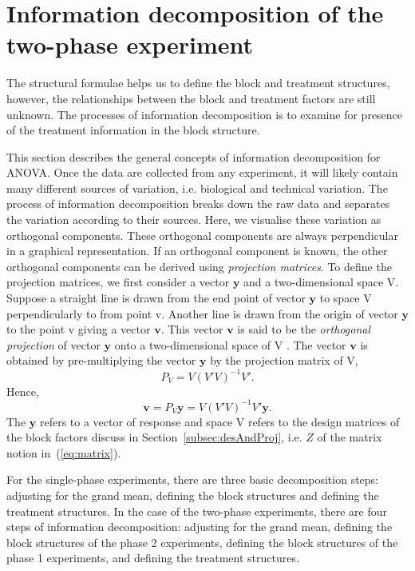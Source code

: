 \documentclass[article]{jss}
\begin{document}
\section[Information Decomposition]{Information decomposition of the two-phase experiment} \label{sec:infoDecomp}
The structural formulae helps us to define the block and treatment structures, however, the relationships between the block and treatment factors are still unknown. The processes of information decomposition is to examine for presence of the treatment information in the block structure.

This section describes the general concepts of information decomposition for ANOVA. Once the data are collected from any experiment, it will likely contain many different sources of variation, i.e. biological and technical variation. The process of information decomposition breaks down the raw data and separates the variation according to their sources. Here, we visualise these variation as orthogonal components. These orthogonal components are always perpendicular in a graphical representation. If an orthogonal component is known, the other orthogonal components can be derived using \emph{projection matrices}. To define the projection matrices, we first consider a vector $\bm{y}$ and a two-dimensional space V. Suppose a straight line is drawn from the end point of vector $\bm{y}$ to space V perpendicularly to from point v. Another line is drawn from the origin of vector $\bm{y}$ to the point v giving a vector $\bm{v}$. This vector $\bm{v}$ is said to be the \emph{orthogonal projection} of vector $\bm{y}$ onto a two-dimensional space of V \citep{Hadi1996}. The vector $\bm{v}$ is obtained by pre-multiplying the vector $\bm{y}$ by the projection matrix of V, 
\begin{equation}\label{eq:projection}
P_{V} = V(V'V)^{-1}V'.
\end{equation}
Hence, 
\begin{equation}\label{eq:vectorProj}
\bm{v} = P_{V} \bm{y} = V(V'V)^{-1}V' \bm{y}.
\end{equation}
The $\bm{y}$ refers to a vector of response and space V refers to the design matrices of the block factors discuss in Section~\ref{subsec:desAndProj}, i.e. $Z$ of the matrix notion in~(\ref{eq:matrix}).

For the single-phase experiments, there are three basic decomposition steps: adjusting for the grand mean, defining the block structures and defining the treatment structures. In the case of the two-phase experiments, there are four steps of information decomposition: adjusting for the grand mean, defining the block structures of the phase 2 experiments,  defining the block structures of the phase 1 experiments, and defining the treatment structures.
\end{document}
